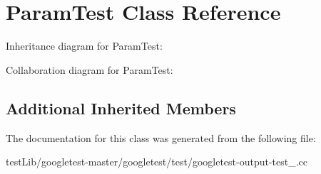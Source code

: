\hypertarget{classParamTest}{}\section{Param\+Test Class Reference}
\label{classParamTest}


Inheritance diagram for Param\+Test\+:


Collaboration diagram for Param\+Test\+:
\subsection*{Additional Inherited Members}


The documentation for this class was generated from the following file\+:\begin{DoxyCompactItemize}
\item 
test\+Lib/googletest-\/master/googletest/test/googletest-\/output-\/test\+\_\+.\+cc\end{DoxyCompactItemize}
